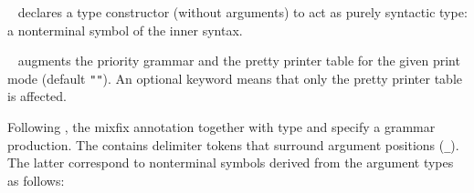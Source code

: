 \begin{isabellebody}
\begin{isamarkuptext}
  \begin{description}

  \item \hyperlink{command.nonterminal}{\mbox{}}~ declares a type
  constructor  (without arguments) to act as purely syntactic
  type: a nonterminal symbol of the inner syntax.

  \item \hyperlink{command.syntax}{\mbox{}}~ augments the
  priority grammar and the pretty printer table for the given print
  mode (default \verb|""|). An optional keyword \hyperlink{keyword.output}{\mbox{}} means that only the pretty printer table is affected.

  Following , the mixfix annotation  together with type  and
  specify a grammar production.  The  contains
  delimiter tokens that surround  argument positions
  (\verb|_|).  The latter correspond to nonterminal symbols
   derived from the argument types  as
  follows:
  \begin{itemize}


\end{itemize}
\end{description}
\end{isamarkuptext}
\end{isabellebody}
